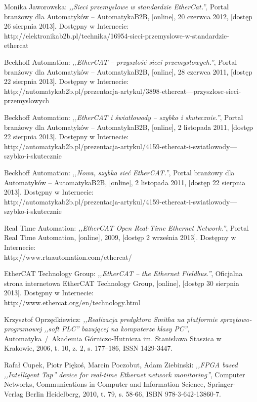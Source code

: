 \begin{thebibliography}{99}
Monika Jaworowska:
\emph{,,Sieci przemysłowe w standardzie EtherCat.''},
Portal branżowy dla Automatyków -- AutomatykaB2B, 
[online],
20 czerwca 2012,
[dostęp 26 sierpnia 2013].
Dostępny w Internecie: \\
http://elektronikab2b.pl/technika/16954-sieci-przemyslowe-w-standardzie-ethercat

Beckhoff Automation:
\emph{,,EtherCAT -- przyszłość sieci przemysłowych.''},
Portal branżowy dla Automatyków -- AutomatykaB2B, 
[online],
28 czerwca 2011,
[dostęp 22 sierpnia 2013].
Dostępny w Internecie: \\
http://automatykab2b.pl/prezentacja-artykul/3898-ethercat---przyszlosc-sieci-przemyslowych

Beckhoff Automation:
\emph{,,EtherCAT i światłowody -- szybko i skutecznie.''},
Portal branżowy dla Automatyków -- AutomatykaB2B, 
[online],
2 listopada 2011,
[dostęp 22 sierpnia 2013].
Dostępny w Internecie: \\
http://automatykab2b.pl/prezentacja-artykul/4159-ethercat-i-swiatlowody---szybko-i-skutecznie

Beckhoff Automation:
\emph{,,Nowa, szybka sieć EtherCAT.''},
Portal branżowy dla Automatyków -- AutomatykaB2B, 
[online],
2 listopada 2011,
[dostęp 22 sierpnia 2013].
Dostępny w Internecie: \\
http://automatykab2b.pl/prezentacja-artykul/4159-ethercat-i-swiatlowody---szybko-i-skutecznie

Real Time Automation:
\emph{,,EtherCAT Open Real-Time Ethernet Network.''},
Portal Real Time Automation, 
[online],
2009,
[dostęp 2 września 2013].
Dostępny w Internecie: \\
http://www.rtaautomation.com/ethercat/

EtherCAT Technology Group:
\emph{,,EtherCAT -- the Ethernet Fieldbus.''},
Oficjalna strona internetowa EtherCAT Technology Group,
[online],
[dostęp 30 sierpnia 2013].
Dostępny w Internecie: \\
http://www.ethercat.org/en/technology.html

Krzysztof Oprzędkiewicz:
\emph{,,Realizacja predyktora Smitha na platformie sprzętowo-programowej ,,soft PLC'' bazującej na komputerze klasy PC''},
Automatyka~/~Akademia Górniczo-Hutnicza im. Stanisława Staszica w Krakowie,
2006,
t. 10, z. 2, s. 177--186,
ISSN 1429-3447.

Rafał Cupek, Piotr Piękoś, Marcin Poczobut, Adam Ziebinski:
\emph{,,FPGA based ,,Intelligent Tap'' device for real-time Ethernet network monitoring''},
Computer Networks, Communications in Computer and Information Science, Springer-Verlag Berlin Heidelberg,
2010,
t. 79, s. 58-66,
ISBN 978-3-642-13860-7.


\end{thebibliography}

